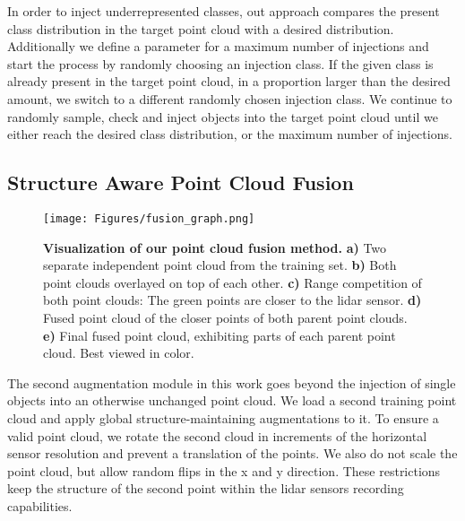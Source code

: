 \documentclass[letterpaper, 10 pt, conference]{ieeeconf}
\begin{document}
In order to inject underrepresented classes, out approach compares the present class distribution in the target point cloud with a desired distribution. Additionally we define a parameter for a maximum number of injections and start the process by randomly choosing an injection class. If the given class is already present in the target point cloud, in a proportion larger than the desired amount, we switch to a different randomly chosen injection class. We continue to randomly sample, check and inject objects into the target point cloud until we either reach the desired class distribution, or the maximum number of injections.

\subsection{Structure Aware Point Cloud Fusion}
\label{section:method:fusion}
\begin{figure*}
	\centering
	\texttt{[image: Figures/fusion\_graph.png]}
	\caption{\textbf{Visualization of our point cloud fusion method.} \textbf{a)} Two separate independent point cloud from the training set. \textbf{b)} Both point clouds overlayed on top of each other. \textbf{c)} Range competition of both point clouds: The green points are closer to the lidar sensor. \textbf{d)} Fused point cloud of the closer points of both parent point clouds. \textbf{e)} Final fused point cloud, exhibiting parts of each parent point cloud. Best viewed in color.}
	\label{fig:fusion}
\end{figure*}
The second augmentation module in this work goes beyond the injection of single objects into an otherwise unchanged point cloud. We load a second training point cloud and apply global structure-maintaining augmentations to it. To ensure a valid point cloud, we rotate the second cloud in increments of the horizontal sensor resolution and prevent a translation of the points. We also do not scale the point cloud, but allow random flips in the x and y direction. These restrictions keep the structure of the second point within the lidar sensors recording capabilities.
\end{document}
